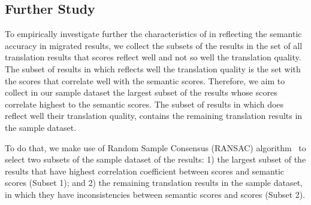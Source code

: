\subsection{Further Study}

 To empirically investigate
further the characteristics of {\model} in reflecting the semantic
accuracy in migrated results, we collect the subsets of the results in
the set of all translation results that {\model} scores reflect well
and not so well the translation quality. The subset of results in
which {\model} reflects well the translation quality is the set with
the {\model} scores that correlate well with the semantic scores.
%
Therefore, we aim to collect in our sample dataset the largest subset
of the results whose {\model} scores correlate highest to the
semantic scores. The subset of results in which {\model} does reflect
well their translation quality, contains the remaining translation
results in the sample dataset.


%


To do that, we make use of Random Sample Consensus (RANSAC)
algorithm~\cite{Fischler:1981:RSC:358669.358692} to select two subsets
of the sample dataset of the results: 1) the largest subset of the
results that have highest correlation coefficient between {\model}
scores and semantic scores (Subset 1); and 2) the remaining
translation results in the sample dataset, in which they have
inconsistencies between semantic scores and {\model} scores (Subset 2).

